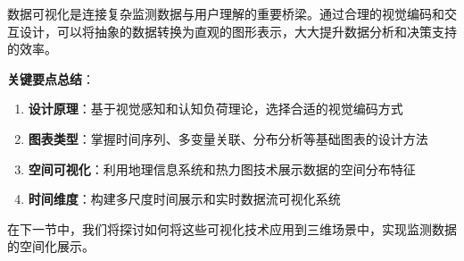 数据可视化是连接复杂监测数据与用户理解的重要桥梁。通过合理的视觉编码和交互设计，可以将抽象的数据转换为直观的图形表示，大大提升数据分析和决策支持的效率。

\textbf{关键要点总结}：

\begin{enumerate}
\def\labelenumi{\arabic{enumi}.}
\item
  \textbf{设计原理}：基于视觉感知和认知负荷理论，选择合适的视觉编码方式
\item
  \textbf{图表类型}：掌握时间序列、多变量关联、分布分析等基础图表的设计方法
\item
  \textbf{空间可视化}：利用地理信息系统和热力图技术展示数据的空间分布特征
\item
  \textbf{时间维度}：构建多尺度时间展示和实时数据流可视化系统
\end{enumerate}

在下一节中，我们将探讨如何将这些可视化技术应用到三维场景中，实现监测数据的空间化展示。
